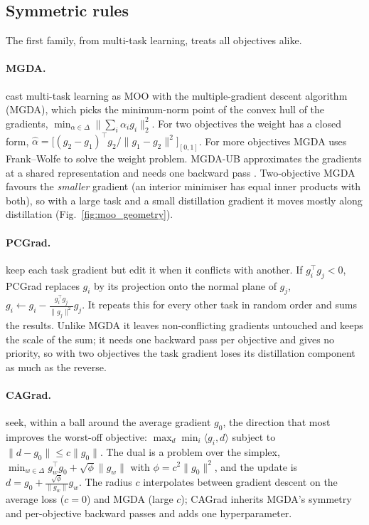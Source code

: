 \subsection{Symmetric rules}
\label{sec:moo_symmetric}

The first family, from multi-task learning, treats all objectives alike.

\paragraph{MGDA.}
\citet{sener2018mgda} cast multi-task learning as MOO with the multiple-gradient descent
algorithm (MGDA), which picks the minimum-norm point of the convex hull of the gradients,
$\min_{\alpha\in\Delta}\|\sum_i\alpha_ig_i\|_2^2$. For two objectives the weight
has a closed form, $\hat\alpha=\big[(g_2-g_1)^\top g_2/\|g_1-g_2\|^2\big]_{[0,1]}$. For more objectives MGDA uses Frank--Wolfe to solve the weight problem. MGDA-UB approximates the gradients at a shared representation and needs one backward pass \citep{sener2018mgda}. Two-objective MGDA favours the \emph{smaller} gradient (an interior minimiser has equal inner
products with both), so with a large task and a small distillation gradient it moves mostly along
distillation (Fig.~\ref{fig:moo_geometry}).

\paragraph{PCGrad.}
\citet{yu2020pcgrad} keep each task gradient but edit it when it conflicts with another.
If $g_i^\top g_j<0$, PCGrad replaces $g_i$ by its projection onto the normal plane of $g_j$,
$g_i\leftarrow g_i-\frac{g_i^\top g_j}{\|g_j\|^2}g_j$. It repeats this for every other task in
random order and sums the results. Unlike MGDA it leaves non-conflicting gradients untouched and
keeps the scale of the sum; it needs one backward pass per objective and gives no priority, so with
two objectives the task gradient loses its distillation component as much as the reverse.

\paragraph{CAGrad.}
\citet{liu2021cagrad} seek, within a ball around the average gradient $g_0$, the direction that
most improves the worst-off objective:
$\max_d\min_i\langle g_i,d\rangle$ subject to $\|d-g_0\|\le c\|g_0\|$. The dual is a problem over
the simplex, $\min_{w\in\Delta}g_w^\top g_0+\sqrt{\phi}\|g_w\|$ with $\phi=c^2\|g_0\|^2$, and the
update is $d=g_0+\frac{\sqrt\phi}{\|g_w\|}g_w$. The radius $c$ interpolates between gradient descent on the average loss ($c=0$) and MGDA (large $c$); CAGrad
inherits MGDA's symmetry and per-objective backward passes and adds one hyperparameter.


